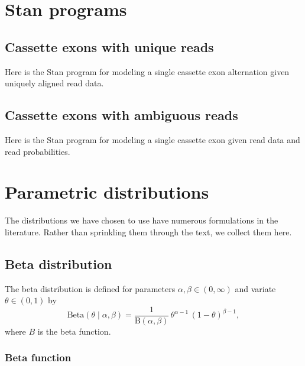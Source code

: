 \documentclass[11pt]{report}
\begin{document}
\appendix

\chapter{Stan programs}\label{chap:stan-programs}

\section{Cassette exons with unique reads}\label{sec:stan-cassette}

Here is the Stan program for modeling a single cassette exon 
alternation given uniquely aligned read data. 


\section{Cassette exons with ambiguous reads}\label{sec:stan-cassette-ambig}

Here is the Stan program for modeling a single cassette exon 
given read data and read probabilities.



\chapter{Parametric distributions}\label{chap:distributions}

The distributions we have chosen to use have numerous formulations in
the literature.  Rather than sprinkling them through the text, we
collect them here.

\section{Beta distribution}\label{sec:beta-distribution}

The beta distribution is defined for parameters $\alpha, \beta \in (0,
\infty)$ and variate $\theta \in (0, 1)$ by
\[
  \textrm{Beta}(\theta \mid \alpha, \beta)
  = \frac{1}{\textrm{B}(\alpha, \beta)}
  \, \theta^{\alpha - 1}
  \, (1 - \theta)^{\beta - 1},
\]
where $B$ is the beta function.

\subsection{Beta function}
\end{document}
